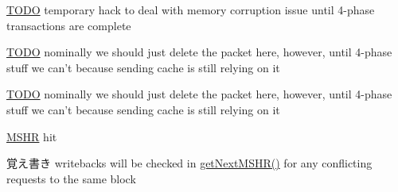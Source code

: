 \begin{Desc}
\item[\hyperlink{todo__todo000075}{TODO}]temporary hack to deal with memory corruption issue until 4-\/phase transactions are complete \end{Desc}


\begin{Desc}
\item[\hyperlink{todo__todo000076}{TODO}]nominally we should just delete the packet here, however, until 4-\/phase stuff we can't because sending cache is still relying on it \end{Desc}


\begin{Desc}
\item[\hyperlink{todo__todo000077}{TODO}]nominally we should just delete the packet here, however, until 4-\/phase stuff we can't because sending cache is still relying on it \end{Desc}


\hyperlink{classMSHR}{MSHR} hit \begin{DoxyNote}{覚え書き}
writebacks will be checked in \hyperlink{classCache_a3ce02537ee4a8918300802fda9b82b47}{getNextMSHR()} for any conflicting requests to the same block 
\end{DoxyNote}



